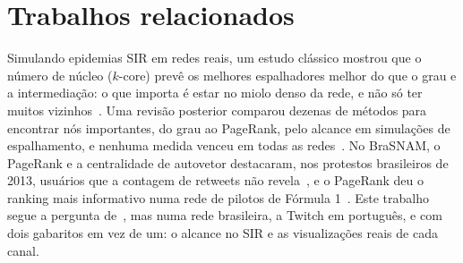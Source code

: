 \section{Trabalhos relacionados}\label{sec:trabalhos}

Simulando epidemias SIR em redes reais, um estudo clássico mostrou que o número de núcleo
($k$-core) prevê os melhores espalhadores melhor do que o grau e a intermediação: o que importa é
estar no miolo denso da rede, e não só ter muitos vizinhos~\cite{kitsak2010}. Uma revisão posterior
comparou dezenas de métodos para encontrar nós importantes, do grau ao PageRank, pelo alcance em
simulações de espalhamento, e nenhuma medida venceu em todas as redes~\cite{lu2016}. No BraSNAM, o
PageRank e a centralidade de autovetor destacaram, nos protestos brasileiros de 2013, usuários que a
contagem de retweets não revela~\cite{theodoro2014}, e o PageRank deu o ranking mais informativo
numa rede de pilotos de Fórmula 1~\cite{faria2024}. Este trabalho segue a pergunta
de~\cite{kitsak2010}, mas numa rede brasileira, a Twitch em português, e com dois gabaritos em vez de
um: o alcance no SIR e as visualizações reais de cada canal.
